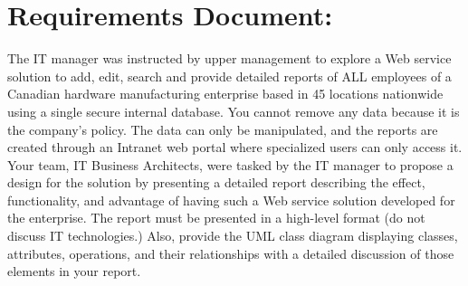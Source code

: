 \section{Requirements Document:}

The IT manager was instructed by upper management to explore a Web service solution to add, edit, search and provide detailed reports of ALL employees of a Canadian hardware manufacturing enterprise based in 45 locations nationwide using a single secure internal database. You cannot remove any data because it is the company’s policy. The data can only be manipulated, and the reports are created through an Intranet web portal where specialized users can only access it.
Your team, IT Business Architects, were tasked by the IT manager to propose a design for the solution by presenting a detailed report describing the effect, functionality, and advantage of having such a Web service solution developed for the enterprise. The report must be presented in a high-level format (do not discuss IT technologies.) Also, provide the UML class diagram displaying classes, attributes, operations, and their relationships with a detailed discussion of those elements in your report.